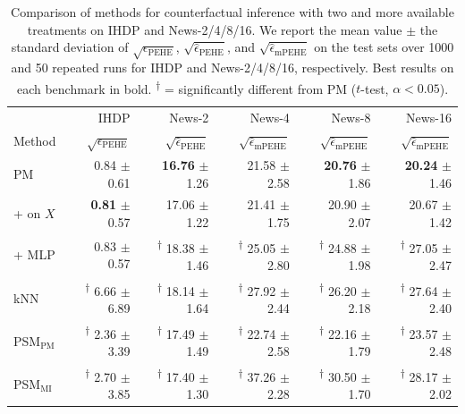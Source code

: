\documentclass{article}
\begin{document}
\begin{table}[t!]
\setlength{\tabcolsep}{1.55ex}
\caption{Comparison of methods for counterfactual inference with two and more available treatments on IHDP and News-2/4/8/16. We report the mean value $\pm$ the standard deviation of $\sqrt{\epsilon_\text{PEHE}}$, $\sqrt{\hat\epsilon_\text{PEHE}}$, and $\sqrt{\hat\epsilon_\text{mPEHE}}$ on the test sets over 1000 and 50 repeated runs for IHDP and News-2/4/8/16, respectively. Best results on each benchmark in bold. \textsuperscript{$\dagger$} = significantly different from PM ($t$-test, $\alpha < 0.05$).}
\label{tb:results_binary}
\centering
\begin{small}
\begin{tabular}{l@{\hskip 3.5ex}r@{\hskip 3.5ex}r@{\hskip 3.5ex}r@{\hskip 3.5ex}r@{\hskip 3.5ex}r}
\toprule
& IHDP & News-2 & News-4 & News-8 & News-16 \\
Method & $\sqrt{\epsilon_\text{PEHE}}$ & $\sqrt{\hat\epsilon_\text{PEHE}}$ & $\sqrt{\hat\epsilon_\text{mPEHE}}$ & $\sqrt{\hat\epsilon_\text{mPEHE}}$ & $\sqrt{\hat\epsilon_\text{mPEHE}}$ \\
\midrule
{PM }\hspace{5ex}   &  {\hspace{1ex}0.84} $\pm$ 0.61 & \textbf{16.76} $\pm$ 1.26 & {21.58} $\pm$ 2.58 & \textbf{20.76} $\pm$ 1.86 & \textbf{20.24} $\pm$ 1.46  \\
+ on $X$  &   \textbf{0.81} $\pm$ 0.57 & {17.06} $\pm$ 1.22 & {21.41} $\pm$ 1.75 & {20.90} $\pm$ 2.07 & {20.67} $\pm$ 1.42  \\
+ MLP  &  {0.83} $\pm$ 0.57 & \textsuperscript{$\dagger$} {18.38} $\pm$ 1.46 & \textsuperscript{$\dagger$} {25.05} $\pm$ 2.80 & \textsuperscript{$\dagger$} {24.88} $\pm$ 1.98 & \textsuperscript{$\dagger$}  {27.05} $\pm$ 2.47  \\
\midrule
kNN  &  \textsuperscript{$\dagger$} {6.66} $\pm$ 6.89 & \textsuperscript{$\dagger$} {18.14} $\pm$ 1.64 & \textsuperscript{$\dagger$} {27.92} $\pm$ 2.44 & \textsuperscript{$\dagger$} {26.20} $\pm$ 2.18 &  \textsuperscript{$\dagger$} {27.64} $\pm$ 2.40  \\
PSM$_\text{PM}$  &  \textsuperscript{$\dagger$} {2.36} $\pm$ 3.39 & \textsuperscript{$\dagger$} {17.49} $\pm$ 1.49 & \textsuperscript{$\dagger$} {22.74} $\pm$ 2.58 & \textsuperscript{$\dagger$} {22.16} $\pm$ 1.79 & \textsuperscript{$\dagger$} {23.57} $\pm$ 2.48  \\
PSM$_\text{MI}$  &  \textsuperscript{$\dagger$} {2.70} $\pm$ 3.85 & \textsuperscript{$\dagger$} {17.40} $\pm$ 1.30 & \textsuperscript{$\dagger$} {37.26} $\pm$ 2.28 & \textsuperscript{$\dagger$} {30.50} $\pm$ 1.70 &  \textsuperscript{$\dagger$} {28.17} $\pm$ 2.02  \\

\end{tabular}
\end{small}
\end{table}
\end{document}
